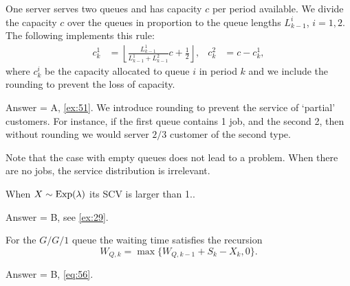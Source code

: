 
\begin{extra}[201904, 1]
  One server serves two queues and has capacity $c$ per period available.
  We divide the capacity $c$ over the queues in proportion to the queue lengths $L^i_{k-1}$, $i=1,2$.
  The following implements this rule:
    \begin{align*}
      c_k^1 &= \left\lfloor \frac{L_{k-1}^1}{L_{k-1}^1 + L_{k-1}^2} c + \frac 1 2 \right\rfloor, & c_k^2 &= c - c_k^1,
    \end{align*}
    where $c_k^i$ be the capacity allocated to queue $i$ in period $k$ and we include the rounding to prevent the loss of capacity.

\begin{solution}
      Answer = A, \ref{ex:51}.
      We introduce rounding to prevent the service of `partial' customers.
      For instance, if the first queue contains 1 job, and the second 2, then without rounding we would server $2/3$ customer of the second type.

      Note that the case with empty queues does not lead to a problem.
      When there are no jobs, the service distribution is irrelevant.
\end{solution}
\end{extra}


\begin{extra}[201904, 1]
When  $X\sim\operatorname{Exp}(\lambda)$ its SCV is larger than 1..
\begin{solution} Answer = B, see \ref{ex:29}.
\end{solution}
\end{extra}

\begin{extra}[201904, 1]
  For the $G/G/1$ queue the waiting time satisfies the recursion
  \begin{equation*}
  W_{Q,k} = \max\{W_{Q,k-1} + S_{k}-X_k, 0\}.
  \end{equation*}
\begin{solution} Answer = B, \eqref{eq:56}.
\end{solution}
\end{extra}

